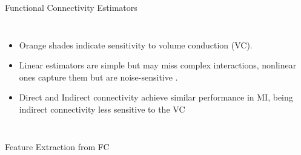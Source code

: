 \documentclass[aspectratio=169]{beamer}
\let\oldcite\cite %
\renewcommand{\cite}[1]{{\tiny\oldcite{#1}}}
\begin{document}
\begin{frame}{Functional Connectivity Estimators}
    \begin{columns}
        \centering
        \begin{itemize}
            \item Orange shades indicate sensitivity to volume conduction (VC).
            \item Linear estimators are simple but may miss complex interactions, nonlinear ones capture them but are noise-sensitive \cite{gonzalez2020network}.
            \item Direct and Indirect connectivity achieve similar performance in MI, being indirect connectivity less sensitive to the VC~\cite{cao2022effective}
        \end{itemize}
    \end{columns}       
\end{frame}


\begin{frame}{Feature Extraction from FC}
    \centering
\end{frame}
\end{document}
